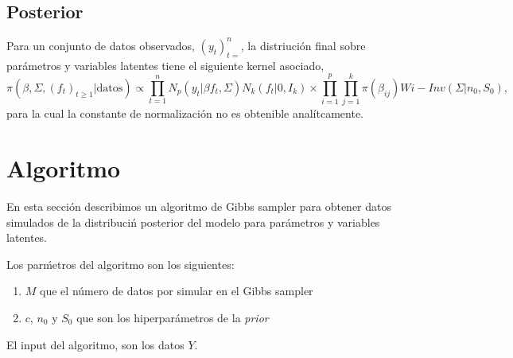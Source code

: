 \documentclass[12pt]{exam}
\begin{document}
\subsection{Posterior}
Para un conjunto de datos observados, $(y_t)_{t=}^{n}$, la distriuci\'on final sobre par\'ametros y variables latentes tiene el siguiente kernel asociado,
$$
\pi\left(\beta,\Sigma,(f_t)_{t\geq 1}|\text{datos}\right)
\propto
\prod_{t=1}^{n}N_p(y_t|\beta f_t,\Sigma) N_{k}(f_t|0, I_k) \times \prod_{i=1}^{p}\prod_{j=1}^{k}\pi(\beta_{ij}) Wi-Inv(\Sigma|n_0,S_0),
$$ 
para la cual la constante de normalizaci\'on no es obtenible anal\'itcamente.

\section{Algoritmo}
En esta secci\'on describimos un algoritmo de Gibbs sampler para obtener datos simulados de la distribuci\'n posterior del modelo para par\'ametros y variables latentes.

Los par\'metros del algoritmo son los siguientes:
\begin{enumerate}
\item $M$ que el n\'umero de datos por simular en el Gibbs sampler
\item $c$, $n_0$ y $S_0$ que son los hiperpar\'ametros de la {\it prior}
\end{enumerate}

El input del algoritmo, son los datos $Y$.
\end{document}
